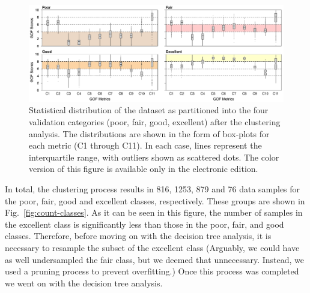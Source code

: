 \begin{figure}
	\centering
	\includegraphics[width=\textwidth]{figures/pdf/figure-06}
	\caption{Statistical distribution of the dataset as partitioned into the four validation categories (poor, fair, good, excellent) after the clustering analysis. The distributions are shown in the form of box-plots for each metric (C1 through C11). In each case,  lines represent the interquartile range, with outliers shown as scattered dots.  The color version of this figure is available only in the electronic edition.}
	\label{fig:boxed-clusters}
\end{figure}

In total, the clustering process results in 816, 1253, 879 and 76 data samples for the poor, fair, good and excellent classes, respectively. These groups are shown in Fig.~\ref{fig:count-classes}. As it can be seen in this figure, the number of samples in the excellent class is significantly less than those in the poor, fair, and good classes. Therefore, before moving on with the decision tree analysis, it is necessary to resample the subset of the excellent class (Arguably, we could have as well undersampled the fair class, but we deemed that unnecessary. Instead, we used a  pruning process to prevent overfitting.) Once this process was completed we went on with the decision tree analysis.

